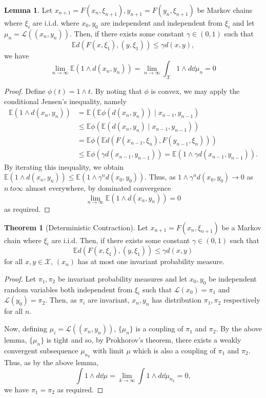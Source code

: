 \documentclass[]{article}
\theoremstyle{definition}
\newtheorem{theorem}{Theorem}
\theoremstyle{definition}
\newtheorem{lemma}{Lemma}[section]
\begin{document}
\begin{lemma}
  Let \(x_{n + 1} = F(x_n, \xi_{n + 1}), y_{n + 1} = F(y_n, \xi_{n + 1})\) be 
  Markov chains where \(\xi_i\) are i.i.d.
  where \(x_0, y_0\) are independent and independent from \(\xi_i\) and let 
  \(\mu_n = \mathcal{L}((x_n, y_n))\). Then, if there exists some constant \(\gamma \in (0, 1)\) such that 
  \[\mathbb{E} d(F(x, \xi_1), (y, \xi_1)) \le \gamma d(x, y),\] 
  we have
  \[\lim_{n \to \infty} \mathbb{E}(1 \wedge d(x_n, y_n)) = 
    \lim_{n \to \infty} \int_{\mathcal{X}} 1 \wedge d \dd \mu_n = 0\]
\end{lemma}
\begin{proof}
  Define \(\phi(t) = 1 \wedge t\). By noting that \(\phi\) is convex, we may apply the 
  conditional Jensen's inequality, namely
  \[\begin{split}
    \mathbb{E}(1 \wedge d(x_n, y_n)) & = \mathbb{E} (\mathbb{E} \phi(d(x_n, y_n)) \mid x_{n - 1}, y_{n - 1})\\
    & \le \mathbb{E} \phi(\mathbb{E}(d(x_n, y_n) \mid x_{n - 1}, y_{n - 1}))\\
    & = \mathbb{E}\phi(\mathbb{E} d(F(x_{n - 1}, \xi_n), F(y_{n - 1}, \xi_n)))\\
    & \le \mathbb{E}\phi(\gamma d(x_{n - 1}, y_{n - 1})) = \mathbb{E}(1 \wedge \gamma d(x_{n - 1}, y_{n - 1})).
  \end{split}\]
  By iterating this inequality, we obtain \(\mathbb{E}(1 \wedge d(x_n, y_n)) \le 
  \mathbb{E}(1 \wedge \gamma^n d(x_0, y_0))\). Thus, as \(1 \wedge \gamma^n d(x_0, y_0) \to 0\) 
  as \(n\ to \infty\) almost everywhere, by dominated convergence 
  \[\lim_{n \to \infty}\mathbb{E}(1 \wedge d(x_n, y_n)) = 0\]
  as required.
\end{proof}

\begin{theorem}[Deterministic Contraction]
  Let \(x_{n + 1} = F(x_n, \xi_{n + 1})\) be a Markov chain where \(\xi_i\) are i.i.d.
  Then, if there exists some constant \(\gamma \in (0, 1)\) such that 
  \[\mathbb{E} d(F(x, \xi_1), (y, \xi_1)) \le \gamma d(x, y)\]
  for all \(x, y \in \mathcal{X}\), \((x_n)\) has at most one invariant probability 
  measure.  
\end{theorem}
\begin{proof}
  Let \(\pi_1, \pi_2\) be invariant probability measures and let \(x_0, y_0\) 
  be independent random variables both independent from \(\xi_i\) such that 
  \(\mathcal{L}(x_0) = \pi_1\) and \(\mathcal{L}(y_0) = \pi_2\). Then, as \(\pi_i\) 
  are invariant, \(x_n, y_n\) has distribution \(\pi_1, \pi_2\) respectively
  for all \(n\). 
  
  Now, defining \(\mu_i = \mathcal{L}((x_n, y_n))\), \(\{\mu_n\}\) is a 
  coupling of \(\pi_1\) and \(\pi_2\). By the above lemma, \(\{\mu_n\}\) is tight 
  and so, by Prokhorov's theorem, there exists a weakly convergent subsequence 
  \(\mu_{n_k}\) with limit \(\mu\) which is also a coupling of \(\pi_1\) and \(\pi_2\).
  Thus, as by the above lemma,
  \[\int 1 \wedge d \dd \mu = \lim_{k \to \infty} \int 1 \wedge d \dd \mu_{n_k} = 0,\]
  we have \(\pi_1 = \pi_2\) as required.
\end{proof}
\end{document}
